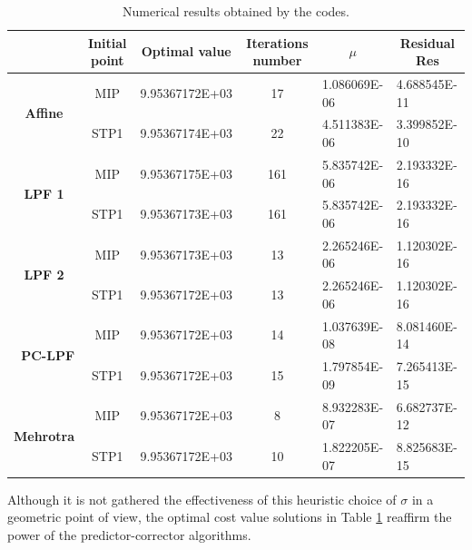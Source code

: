 \documentclass[a4paper,10 pt,titlepage,twoside]{book}
\theoremstyle{plain}
\theoremstyle{definition}
\theoremstyle{remark}
\begin{document}
\begin{table}[t]\caption{\label{table:SWE}Numerical results obtained by the codes.}
	\begin{tabular}{cclcll}
		\hline		\textbf{} & \textbf{Initial point} & \multicolumn{1}{c}{\textbf{Optimal value}} & \textbf{Iterations number} & \multicolumn{1}{c}{\textbf{$\mu$}} & \multicolumn{1}{c}{\textbf{Residual} Res} \\ \hline
		\multicolumn{1}{c|}{\multirow{2}{*}{\textbf{Affine}}} & MIP & 9.95367172E+03 & 17 & 1.086069E-06 & 4.688545E-11 \\
		\multicolumn{1}{c|}{} & STP1 & 9.95367174E+03 & 22 & 4.511383E-06 & 3.399852E-10 \\ \hline
		\multicolumn{1}{c|}{\multirow{2}{*}{\textbf{LPF 1}}} & MIP & 9.95367175E+03 & 161 & 5.835742E-06 & 2.193332E-16 \\
		\multicolumn{1}{c|}{} & STP1 & 9.95367173E+03 & 161 & 5.835742E-06 & 2.193332E-16 \\ \hline
		\multicolumn{1}{c|}{\multirow{2}{*}{\textbf{LPF 2}}} & MIP & 9.95367173E+03 & 13 & 2.265246E-06 & 1.120302E-16 \\
		\multicolumn{1}{c|}{} & STP1 & 9.95367172E+03 & 13 & 2.265246E-06 & 1.120302E-16 \\ \hline
		\multicolumn{1}{r|}{\multirow{2}{*}{\textbf{PC-LPF}}} & MIP & 9.95367172E+03 & 14 & 1.037639E-08 & 8.081460E-14 \\
		\multicolumn{1}{r|}{} & STP1 & 9.95367172E+03 & 15 & 1.797854E-09 & 7.265413E-15 \\ \hline
		\multicolumn{1}{c|}{\multirow{2}{*}{\textbf{Mehrotra}}} & MIP & 9.95367172E+03 & 8 & 8.932283E-07 & 6.682737E-12 \\
		\multicolumn{1}{c|}{} & STP1 & 9.95367172E+03 & 10 & 1.822205E-07 & 8.825683E-15 \\ \hline
	\end{tabular}
\end{table}
Although it is not gathered the effectiveness of this heuristic choice of $\sigma$ in a geometric point of view, the optimal cost value solutions in Table \ref{table:SWE} reaffirm the power of the predictor-corrector algorithms.   
\end{document}
